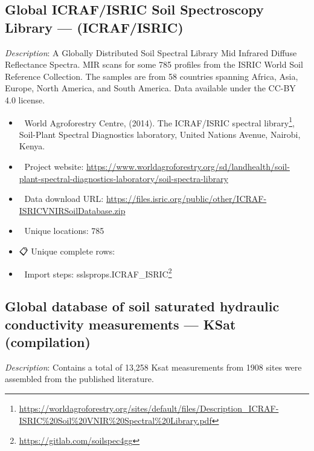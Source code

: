 \documentclass[
  graybox,natbib,nospthms]{svmono}
\providecommand{\tightlist}{%
  \setlength{\itemsep}{0pt}\setlength{\parskip}{0pt}}
\providecommand{\tightlist}{\setlength{\itemsep}{0pt}\setlength{\parskip}{0pt}}
\renewcommand{\href}[2]{#2 (\url{#1})}
\renewcommand{\href}[2]{#2\footnote{\url{#1}}}
\begin{document}
\hypertarget{global-icrafisric-soil-spectroscopy-library-icrafisric}{%
\subsection{Global ICRAF/ISRIC Soil Spectroscopy Library --- (ICRAF/ISRIC)}\label{global-icrafisric-soil-spectroscopy-library-icrafisric}}

\emph{Description}: A Globally Distributed Soil Spectral Library Mid Infrared Diffuse
Reflectance Spectra. MIR scans for some 785 profiles from the ISRIC World Soil Reference Collection.
The samples are from 58 countries spanning Africa, Asia, Europe, North America, and South America.
Data available under the CC-BY 4.0 license.

\begin{itemize}
\tightlist
\item
  📕 World Agroforestry Centre, (2014). \href{https://worldagroforestry.org/sites/default/files/Description_ICRAF-ISRIC\%20Soil\%20VNIR\%20Spectral\%20Library.pdf}{The ICRAF/ISRIC spectral library}, Soil-Plant Spectral Diagnostics laboratory, United
  Nations Avenue, Nairobi, Kenya.\\
\item
  🔗 Project website: \url{https://www.worldagroforestry.org/sd/landhealth/soil-plant-spectral-diagnostics-laboratory/soil-spectra-library}\\
\item
  📂 Data download URL: \url{https://files.isric.org/public/other/ICRAF-ISRICVNIRSoilDatabase.zip}\\
\item
  📍 Unique locations: 785\\
\item
  📋 Unique complete rows:\\
\item
  📝 Import steps: \href{https://gitlab.com/soilspec4gg}{sslsprops.ICRAF\_ISRIC}
\end{itemize}

\hypertarget{global-database-of-soil-saturated-hydraulic-conductivity-measurements-ksat-compilation}{%
\subsection{Global database of soil saturated hydraulic conductivity measurements --- KSat (compilation)}\label{global-database-of-soil-saturated-hydraulic-conductivity-measurements-ksat-compilation}}

\emph{Description}: Contains a total of 13,258 Ksat measurements from 1908 sites were assembled from the published literature.
\end{document}
